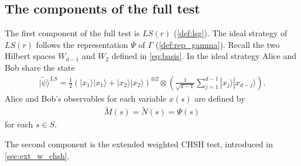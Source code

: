 \documentclass[11pt,letterpaper]{article}
\newcommand{\ket}[1]{|#1\rangle}
\newcommand{\x}{\otimes}
\newcommand{\1}{\mathbb{1}}
\newcommand{\LS}{LS}
\newcommand{\tM}{\tilde{M}}
\newcommand{\tN}{\tilde{N}}
\newcommand{\tpsi}{\tilde{\psi}}
\theoremstyle{definition}
\begin{document}
\subsection{The components of the full test}
\label{sec:tests}

The first component of the full test is $\LS(r)$ (\cref{def:lsg}).
The ideal strategy of $\LS(r)$ follows the representation $\Psi$ of $\Gamma$ (\cref{def:rep_gamma}).
Recall the two Hilbert spaces $W_{d-1}$ and $W_2$ defined in \cref{eq:basis}. 
In the ideal strategy Alice and Bob share the state 
\begin{align}
    \label{eq:ideal_st_ls}
        \ket{\tpsi}^{\LS} = \frac{1}{2} (\ket{x_1}\ket{x_1} + \ket{x_2}\ket{x_2})^{\x 2} \x \left(\frac{1}{\sqrt{d-1}} \sum_{j=1}^{d-1} \ket{x_j}\ket{x_{d-j}}\right).
\end{align}
Alice and Bob's observables for each variable $x(s)$ are
defined by
\begin{align*}
    \tM(s) = \tN(s) = \Psi(s) 
\end{align*}
for each $s \in S$.


The second component is the extended weighted CHSH test, introduced in \cref{sec:ext_w_chsh}.
\end{document}
